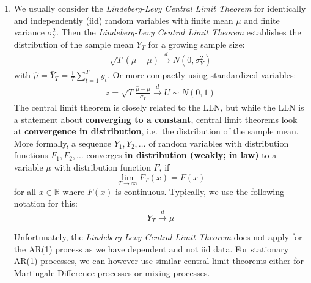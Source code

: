 \begin{enumerate}

\item
We usually consider the \emph{Lindeberg-Levy Central Limit Theorem} for identically and independently (iid) random variables
  with finite mean \( \mu \) and finite variance \(\sigma_Y^2\).
Then the \emph{Lindeberg-Levy Central Limit Theorem} establishes the distribution of the sample mean \(\overline{Y}_T\) for a growing sample size:
\begin{align*}
\sqrt{T} (\hat{\mu}-\mu) \overset{d}{\rightarrow} N(0,\sigma_Y^2)
\end{align*}
with \(\hat{\mu} = \bar{Y}_T = \frac{1}{T} \sum_{t=1}^T y_t\).
Or more compactly using standardized variables:
\begin{align*}
z = \sqrt{T}\frac{\hat{\mu}-\mu}{\sigma_Y}\overset{d}{\rightarrow} U \sim N(0,1)
\end{align*}
The central limit theorem is closely related to the LLN,
  but while the LLN is a statement about \textbf{converging to a constant},
  central limit theorems look at \textbf{convergence in distribution},
  i.e.\ the distribution of the sample mean.
More formally, a sequence \(\bar{Y}_{1},\bar{Y}_{2},\ldots \) of random variables with distribution functions
\(F_{1},F_{2},\ldots \) converges \textbf{in distribution (weakly; in law)}
to a variable \(\mu \) with distribution function \(F\), if
\begin{equation*}
\lim_{T\rightarrow \infty }F_{T}(x)=F(x)
\end{equation*}
for all \(x\in \mathbb{R}\) where \(F(x)\) is continuous.
Typically, we use the following notation for this:
\begin{equation*}
\bar{Y}_{T}\overset{d}{\rightarrow }\mu
\end{equation*}

Unfortunately, the \emph{Lindeberg-Levy Central Limit Theorem} does not apply
  for the AR{(1)} process as we have dependent and not iid data.
For stationary AR{(1)} processes, we can however use similar central limit theorems
  either for Martingale-Difference-processes or mixing processes.


\end{enumerate}
